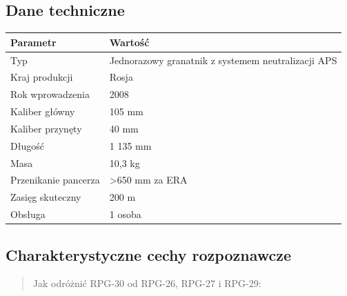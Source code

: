 \documentclass[12pt,oneside]{book}
\begin{document}
\subsection{Dane techniczne}\label{dane-techniczne-89}

\begin{longtable}[]{@{}ll@{}}
\toprule\noalign{}
Parametr & Wartość \\
\midrule\noalign{}
\endhead
\bottomrule\noalign{}
\endlastfoot
Typ & Jednorazowy granatnik z systemem neutralizacji APS \\
Kraj produkcji & Rosja \\
Rok wprowadzenia & 2008 \\
Kaliber główny & 105 mm \\
Kaliber przynęty & 40 mm \\
Długość & 1 135 mm \\
Masa & 10,3 kg \\
Przenikanie pancerza & \textgreater650 mm za ERA \\
Zasięg skuteczny & 200 m \\
Obsługa & 1 osoba \\
\end{longtable}

\subsection{Charakterystyczne cechy
rozpoznawcze}\label{charakterystyczne-cechy-rozpoznawcze-89}

\begin{quote}
Jak odróżnić RPG-30 od RPG-26, RPG-27 i RPG-29:
\end{quote}
\end{document}
